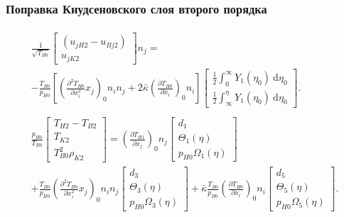 \documentclass[mathserif]{beamer} %
\newcommand{\dd}{\:\mathrm{d}}
\newcommand{\pder}[2][]{\frac{\partial#1}{\partial#2}}
\newcommand{\pderder}[2][]{\frac{\partial^2 #1}{\partial #2^2}}
\newcommand{\onwall}[1]{\left(#1\right)_0}
\begin{document}
\begin{frame}
    \frametitle{Поправка Кнудсеновского слоя второго порядка}
    \footnotesize
    \begin{gather}
        \begin{multlined}
            \frac1{\sqrt{T_{B0}}}
                \begin{bmatrix} (u_{jH2} - u_{Bj2}) \\ u_{jK2} \end{bmatrix} n_j = \\
            - \frac{T_{B0}}{p_{H0}}\left[ \onwall{\pderder[T_{H0}]{x_i}{x_j}}n_i n_j
                + 2\bar\kappa\onwall{\pder[T_{H0}]{x_i}}n_i \right]
                \begin{bmatrix} \frac12\int_0^\infty Y_1(\eta_0)\dd\eta_0 \\
                    \frac12\int_\infty^{\eta} Y_1(\eta_0)\dd\eta_0 \end{bmatrix}.
        \end{multlined}\label{eq:boundary_u2n}\\
        \begin{multlined}
            \frac{p_{H0}}{T_{B0}}
                \begin{bmatrix} T_{H2} - T_{B2} \\ T_{K2} \\ T_{B0}^2\rho_{K2} \end{bmatrix} =
            \onwall{\pder[T_{H1}]{x_j}} n_j
                \begin{bmatrix} d_1 \\ \Theta_1(\eta) \\ p_{H0}\Omega_1(\eta) \end{bmatrix} \\
            + \frac{T_{B0}}{p_{H0}}\onwall{\pderder[T_{H0}]{x_i}{x_j}} n_i n_j
                \begin{bmatrix} d_3 \\ \Theta_3(\eta) \\ p_{H0}\Omega_3(\eta) \end{bmatrix}
            + \bar\kappa\frac{T_{B0}}{p_{H0}}\onwall{\pder[T_{H0}]{x_i}} n_i
                \begin{bmatrix} d_5 \\ \Theta_5(\eta) \\ p_{H0}\Omega_5(\eta) \end{bmatrix}.
        \end{multlined}\label{eq:boundary_T2}
    \end{gather}
\end{frame}
\end{document}
